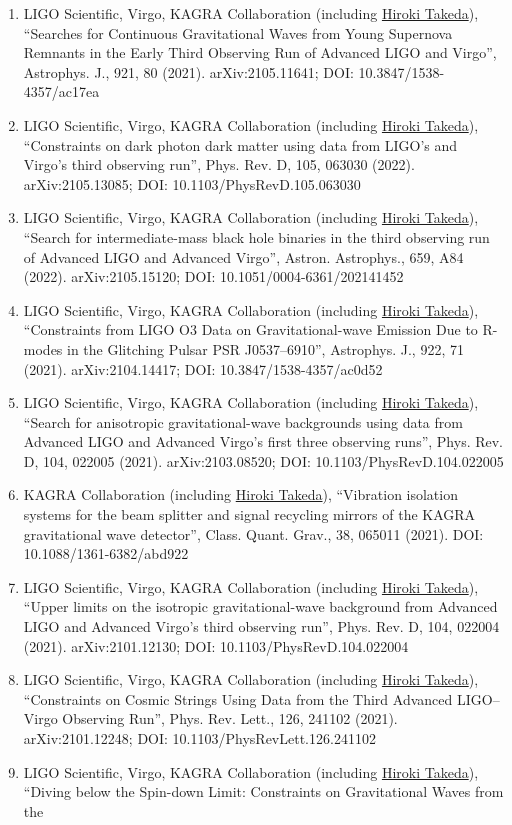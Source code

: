\documentclass[uplatex, 11pt]{jsarticle}
\begin{document}
\begin{enumerate}
\item LIGO Scientific, Virgo, KAGRA Collaboration (including \uline{Hiroki Takeda}), “Searches for Continuous Gravitational Waves from Young Supernova Remnants in the Early Third Observing Run of Advanced LIGO and Virgo”, Astrophys. J., 921, 80 (2021). arXiv:2105.11641; DOI: 10.3847/1538-4357/ac17ea
\item LIGO Scientific, Virgo, KAGRA Collaboration (including \uline{Hiroki Takeda}), “Constraints on dark photon dark matter using data from LIGO's and Virgo's third observing run”, Phys. Rev. D, 105, 063030 (2022). arXiv:2105.13085; DOI: 10.1103/PhysRevD.105.063030
\item LIGO Scientific, Virgo, KAGRA Collaboration (including \uline{Hiroki Takeda}), “Search for intermediate-mass black hole binaries in the third observing run of Advanced LIGO and Advanced Virgo”, Astron. Astrophys., 659, A84 (2022). arXiv:2105.15120; DOI: 10.1051/0004-6361/202141452
\item LIGO Scientific, Virgo, KAGRA Collaboration (including \uline{Hiroki Takeda}), “Constraints from LIGO O3 Data on Gravitational-wave Emission Due to R-modes in the Glitching Pulsar PSR J0537–6910”, Astrophys. J., 922, 71 (2021). arXiv:2104.14417; DOI: 10.3847/1538-4357/ac0d52
\item LIGO Scientific, Virgo, KAGRA Collaboration (including \uline{Hiroki Takeda}), “Search for anisotropic gravitational-wave backgrounds using data from Advanced LIGO and Advanced Virgo's first three observing runs”, Phys. Rev. D, 104, 022005 (2021). arXiv:2103.08520; DOI: 10.1103/PhysRevD.104.022005
\item KAGRA Collaboration (including \uline{Hiroki Takeda}), “Vibration isolation systems for the beam splitter and signal recycling mirrors of the KAGRA gravitational wave detector”, Class. Quant. Grav., 38, 065011 (2021). DOI: 10.1088/1361-6382/abd922
\item LIGO Scientific, Virgo, KAGRA Collaboration (including \uline{Hiroki Takeda}), “Upper limits on the isotropic gravitational-wave background from Advanced LIGO and Advanced Virgo's third observing run”, Phys. Rev. D, 104, 022004 (2021). arXiv:2101.12130; DOI: 10.1103/PhysRevD.104.022004
\item LIGO Scientific, Virgo, KAGRA Collaboration (including \uline{Hiroki Takeda}), “Constraints on Cosmic Strings Using Data from the Third Advanced LIGO–Virgo Observing Run”, Phys. Rev. Lett., 126, 241102 (2021). arXiv:2101.12248; DOI: 10.1103/PhysRevLett.126.241102
\item LIGO Scientific, Virgo, KAGRA Collaboration (including \uline{Hiroki Takeda}), “Diving below the Spin-down Limit: Constraints on Gravitational Waves from the

\end{enumerate}
\end{document}
